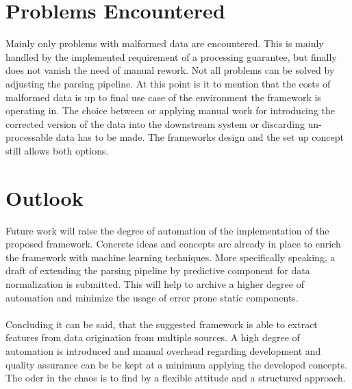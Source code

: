 \section{Problems Encountered\label{sec:problems}}

Mainly only problems with malformed data are encountered. This is mainly handled by the implemented requirement of a processing guarantee, but finally does not vanish the need of manual rework. Not all problems can be solved by adjusting the parsing pipeline. At this point is it to mention that the costs of malformed data is up to final use case of the environment the framework is operating in. The choice between or applying manual work for introducing the corrected version of the data into the downstream system or discarding un-processable data has to be made. The frameworks design and the set up concept still allows both options. 

\section{Outlook\label{sec:outlook}}

Future work will raise the degree of automation of the implementation of the proposed framework. Concrete ideas and concepts are already in place to enrich the framework with machine learning techniques. More specifically speaking, a draft of extending the parsing pipeline by predictive component for data normalization is submitted. This will help to archive a higher degree of automation and minimize the usage of error prone static components.
\\\\
Concluding it can be said, that the suggested framework is able to extract features from data origination from multiple sources. A high degree of automation is introduced and manual overhead regarding development and quality assurance can be be kept at a minimum applying the developed concepts. The oder in the chaos is to find by a flexible attitude and a structured approach. 